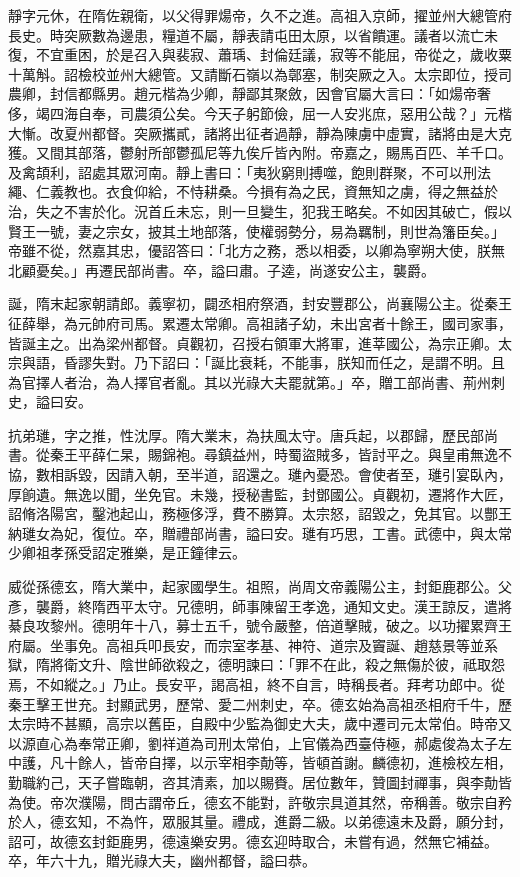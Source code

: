 \begin{pinyinscope}
 靜字元休，在隋佐親衛，以父得罪煬帝，久不之進。高祖入京師，擢並州大總管府長史。時突厥數為邊患，糧道不屬，靜表請屯田太原，以省饋運。議者以流亡未復，不宜重困，於是召入與裴寂、蕭瑀、封倫廷議，寂等不能屈，帝從之，歲收粟十萬斛。詔檢校並州大總管。又請斷石嶺以為鄣塞，制突厥之入。太宗即位，授司農卿，封信都縣男。趙元楷為少卿，靜鄙其聚斂，因會官屬大言曰：「如煬帝奢侈，竭四海自奉，司農須公矣。今天子躬節儉，屈一人安兆庶，惡用公哉？」元楷大慚。改夏州都督。突厥攜貳，諸將出征者過靜，靜為陳虜中虛實，諸將由是大克獲。又間其部落，鬱射所部鬱孤尼等九俟斤皆內附。帝嘉之，賜馬百匹、羊千口。及禽頡利，詔處其眾河南。靜上書曰：「夷狄窮則搏噬，飽則群聚，不可以刑法繩、仁義教也。衣食仰給，不恃耕桑。今損有為之民，資無知之虜，得之無益於治，失之不害於化。況首丘未忘，則一旦變生，犯我王略矣。不如因其破亡，假以賢王一號，妻之宗女，披其土地部落，使權弱勢分，易為羈制，則世為籓臣矣。」帝雖不從，然嘉其忠，優詔答曰：「北方之務，悉以相委，以卿為寧朔大使，朕無北顧憂矣。」再遷民部尚書。卒，謚曰肅。子逵，尚遂安公主，襲爵。



 誕，隋末起家朝請郎。義寧初，闢丞相府祭酒，封安豐郡公，尚襄陽公主。從秦王征薛舉，為元帥府司馬。累遷太常卿。高祖諸子幼，未出宮者十餘王，國司家事，皆誕主之。出為梁州都督。貞觀初，召授右領軍大將軍，進莘國公，為宗正卿。太宗與語，昏謬失對。乃下詔曰：「誕比衰耗，不能事，朕知而任之，是謂不明。且為官擇人者治，為人擇官者亂。其以光祿大夫罷就第。」卒，贈工部尚書、荊州刺史，謚曰安。



 抗弟璡，字之推，性沈厚。隋大業末，為扶風太守。唐兵起，以郡歸，歷民部尚書。從秦王平薛仁杲，賜錦袍。尋鎮益州，時蜀盜賊多，皆討平之。與皇甫無逸不協，數相訴毀，因請入朝，至半道，詔還之。璡內憂恐。會使者至，璡引宴臥內，厚餉遺。無逸以聞，坐免官。未幾，授秘書監，封鄧國公。貞觀初，遷將作大匠，詔脩洛陽宮，鑿池起山，務極侈浮，費不勝算。太宗怒，詔毀之，免其官。以酆王納璡女為妃，復位。卒，贈禮部尚書，謚曰安。璡有巧思，工書。武德中，與太常少卿祖孝孫受詔定雅樂，是正鐘律云。



 威從孫德玄，隋大業中，起家國學生。祖照，尚周文帝義陽公主，封鉅鹿郡公。父彥，襲爵，終隋西平太守。兄德明，師事陳留王孝逸，通知文史。漢王諒反，遣將綦良攻黎州。德明年十八，募士五千，號令嚴整，倍道擊賊，破之。以功擢累齊王府屬。坐事免。高祖兵叩長安，而宗室孝基、神符、道宗及竇誕、趙慈景等並系獄，隋將衛文升、陰世師欲殺之，德明諫曰：「罪不在此，殺之無傷於彼，祗取怨焉，不如縱之。」乃止。長安平，謁高祖，終不自言，時稱長者。拜考功郎中。從秦王擊王世充。封顯武男，歷常、愛二州刺史，卒。德玄始為高祖丞相府千牛，歷太宗時不甚顯，高宗以舊臣，自殿中少監為御史大夫，歲中遷司元太常伯。時帝又以源直心為奉常正卿，劉祥道為司刑太常伯，上官儀為西臺侍極，郝處俊為太子左中護，凡十餘人，皆帝自擇，以示宰相李勣等，皆頓首謝。麟德初，進檢校左相，勤職約己，天子嘗臨朝，咨其清素，加以賜賚。居位數年，贊圖封禪事，與李勣皆為使。帝次濮陽，問古謂帝丘，德玄不能對，許敬宗具道其然，帝稱善。敬宗自矜於人，德玄知，不為忤，眾服其量。禮成，進爵二級。以弟德遠未及爵，願分封，詔可，故德玄封鉅鹿男，德遠樂安男。德玄迎時取合，未嘗有過，然無它補益。卒，年六十九，贈光祿大夫，幽州都督，謚曰恭。




\end{pinyinscope}
